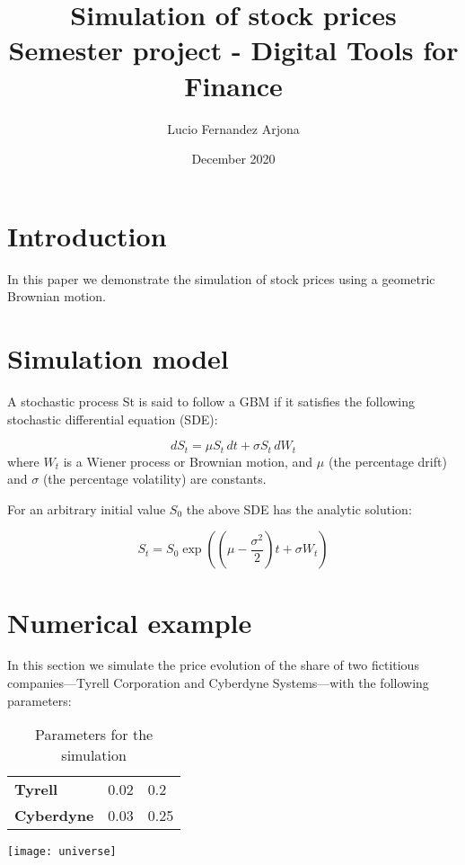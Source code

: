 \documentclass{article}
\title{Simulation of stock prices \\ Semester project - Digital Tools for Finance}
\author{Lucio Fernandez Arjona}
\date{December 2020}
\begin{document}
\maketitle

\tableofcontents

\section{Introduction}
In this paper we demonstrate the simulation of stock prices using a geometric Brownian motion.

\section{Simulation model}
A stochastic process St is said to follow a GBM if it satisfies the following stochastic differential equation (SDE):

\[dS_{t}=\mu S_{t}\,dt+\sigma S_{t}\,dW_{t}\]
where $W_{t}$ is a Wiener process or Brownian motion, and $\mu$  (the percentage drift) and $\sigma$  (the percentage volatility) are constants.

For an arbitrary initial value $S_0$ the above SDE has the analytic solution:

\[S_{t}=S_{0}\exp \left(\left(\mu -{\frac {\sigma ^{2}}{2}}\right)t+\sigma W_{t}\right)\]

\section{Numerical example}
In this section we simulate the price evolution of the share of two fictitious companies---Tyrell Corporation and Cyberdyne Systems---with the following parameters:

\begin{table}[]
\begin{tabular}{lll}
\toprule
                   & \boldsymbol{\mu} & \boldsymbol{\sigma} \\ 
\midrule
\textbf{Tyrell}    & 0.02         & 0.2             \\ 
\textbf{Cyberdyne} & 0.03         & 0.25            \\ 
\bottomrule
\end{tabular}
\caption{Parameters for the simulation}
\end{table}

\texttt{[image: universe]}
\end{document}
